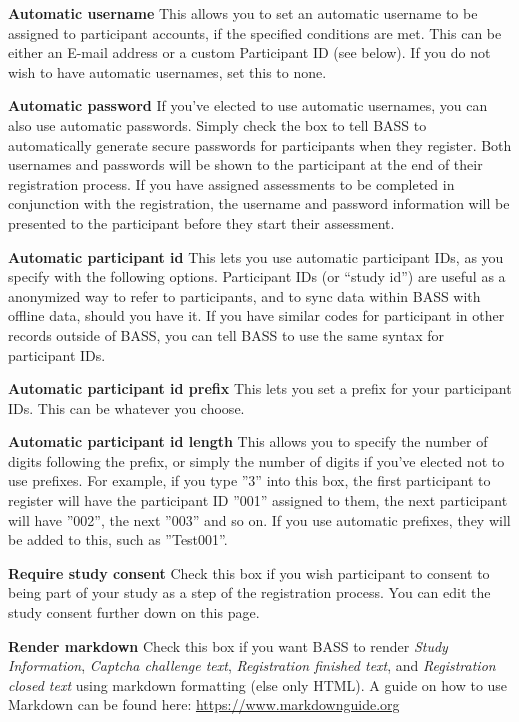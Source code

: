 \documentclass[
]{book}
\begin{document}
\textbf{Automatic username}
This allows you to set an automatic username to be assigned to participant accounts, if the specified conditions are met. This can be either an E-mail address or a custom Participant ID (see below). If you do not wish to have automatic usernames, set this to none.

\textbf{Automatic password}
If you've elected to use automatic usernames, you can also use automatic passwords. Simply check the box to tell BASS to automatically generate secure passwords for participants when they register. Both usernames and passwords will be shown to the participant at the end of their registration process. If you have assigned assessments to be completed in conjunction with the registration, the username and password information will be presented to the participant before they start their assessment.

\textbf{Automatic participant id}
This lets you use automatic participant IDs, as you specify with the following options. Participant IDs (or ``study id'') are useful as a anonymized way to refer to participants, and to sync data within BASS with offline data, should you have it. If you have similar codes for participant in other records outside of BASS, you can tell BASS to use the same syntax for participant IDs.

\textbf{Automatic participant id prefix}
This lets you set a prefix for your participant IDs. This can be whatever you choose.

\textbf{Automatic participant id length}
This allows you to specify the number of digits following the prefix, or simply the number of digits if you've elected not to use prefixes. For example, if you type ''3'' into this box, the first participant to register will have the participant ID ''001'' assigned to them, the next participant will have ''002'', the next ''003'' and so on. If you use automatic prefixes, they will be added to this, such as ''Test001''.

\textbf{Require study consent}
Check this box if you wish participant to consent to being part of your study as a step of the registration process. You can edit the study consent further down on this page.

\textbf{Render markdown}
Check this box if you want BASS to render \emph{Study Information}, \emph{Captcha challenge text}, \emph{Registration finished text}, and \emph{Registration closed text} using markdown formatting (else only HTML). A guide on how to use Markdown can be found here: \url{https://www.markdownguide.org}
\end{document}
